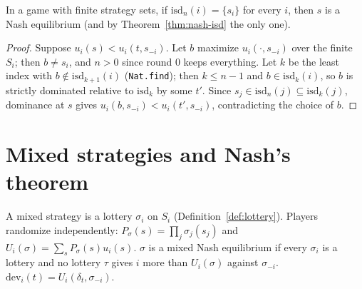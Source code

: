 \begin{theorem}
\label{thm:isd-singleton}
\leanok
{}
In a game with finite strategy sets, if $\mathrm{isd}_n(i) = \{s_i\}$ for every $i$, then $s$ is a Nash
equilibrium (and by Theorem~\ref{thm:nash-isd} the only one).
\end{theorem}
\begin{proof}
\leanok
Suppose $u_i(s) < u_i(t, s_{-i})$. Let $b$ maximize $u_i(\cdot, s_{-i})$ over the finite $S_i$; then $b \ne s_i$,
and $n > 0$ since round $0$ keeps everything. Let $k$ be the least index with $b \notin \mathrm{isd}_{k+1}(i)$
(\texttt{Nat.find}); then $k \le n-1$ and $b \in \mathrm{isd}_k(i)$, so $b$ is strictly dominated relative to
$\mathrm{isd}_k$ by some $t'$. Since $s_j \in \mathrm{isd}_n(j) \subseteq \mathrm{isd}_k(j)$, dominance at $s$
gives $u_i(b, s_{-i}) < u_i(t', s_{-i})$, contradicting the choice of $b$.
\end{proof}

\section{Mixed strategies and Nash's theorem}
\label{sec:mixed}

\begin{definition}
\label{def:mixed}
\leanok
{}
A mixed strategy is a lottery $\sigma_i$ on $S_i$ (Definition~\ref{def:lottery}). Players randomize
independently: $P_\sigma(s) = \prod_j \sigma_j(s_j)$ and $U_i(\sigma) = \sum_s P_\sigma(s) u_i(s)$. $\sigma$ is a
mixed Nash equilibrium if every $\sigma_i$ is a lottery and no lottery $\tau$ gives $i$ more than
$U_i(\sigma)$ against $\sigma_{-i}$. $\mathrm{dev}_i(t) = U_i(\delta_t, \sigma_{-i})$.
\end{definition}

